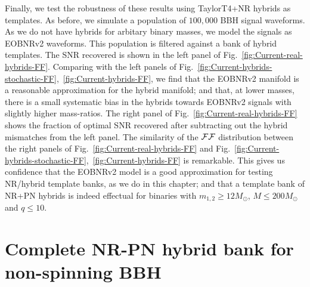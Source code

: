 Finally, we test the robustness of these results using TaylorT4+NR hybrids 
as templates. As before, we simulate a population of $100,000$ BBH signal 
waveforms. As we do not have hybrids for arbitary binary
masses, we model the signals as EOBNRv2 waveforms. This population is filtered
against a bank of hybrid templates. The SNR recovered is shown in the left 
panel of Fig.~\ref{fig:Current-real-hybrids-FF}. Comparing with the left panels 
of Fig.~\ref{fig:Current-hybrids-stochastic-FF},~\ref{fig:Current-hybrids-FF}, 
we find that the EOBNRv2 manifold is a reasonable approximation for the hybrid 
manifold; and that, at lower masses, there is a small systematic bias in the 
hybrids towards EOBNRv2 signals with slightly higher mass-ratios.
The right panel of Fig.~\ref{fig:Current-real-hybrids-FF} 
shows the fraction of optimal SNR recovered after subtracting out the hybrid
mismatches from the left panel. The similarity of the $\mathcal{FF}$ distribution between 
the right panels of Fig.~\ref{fig:Current-real-hybrids-FF} and 
Fig.~\ref{fig:Current-hybrids-stochastic-FF},~\ref{fig:Current-hybrids-FF}
is remarkable. This gives us confidence that the EOBNRv2 model is a good 
approximation for testing NR/hybrid template banks, as we do in this chapter; 
and that a template bank of NR+PN hybrids is indeed effectual for binaries 
with $m_{1,2}\geq 12M_\odot$, $M\leq 200M_\odot$ and $q\leq 10$.



\section{Complete NR-PN hybrid bank for non-spinning BBH}\label{s1:futureNRpNhybridbank}

